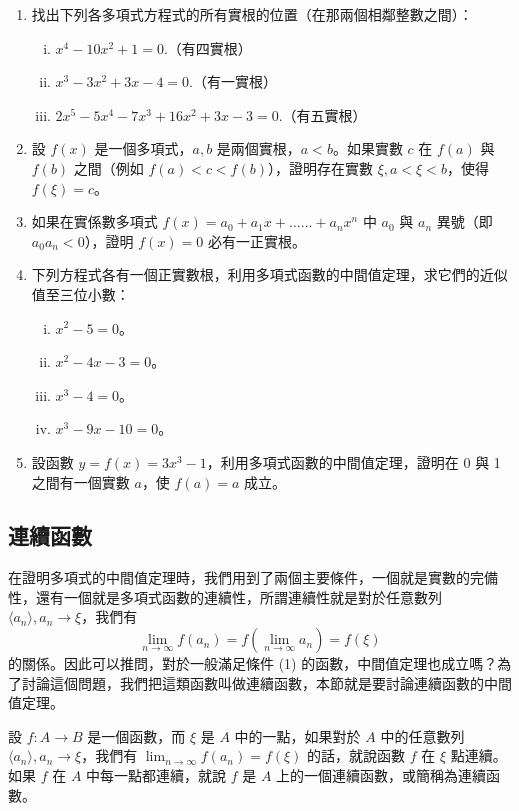 \begin{enumerate}
    \item 找出下列各多項式方程式的所有實根的位置（在那兩個相鄰整數之間）：
    \begin{enumerate}[(i)]
        \item $x^4-10x^2+1=0$.（有四實根）
        \item $x^3-3x^2+3x-4=0$.（有一實根）
        \item $2x^5-5x^4-7x^3+16x^2+3x-3=0$.（有五實根）
    \end{enumerate}
    \item 設 $f(x)$ 是一個多項式，$a, b$ 是兩個實根\label{note:b2-ch3-ex3-4-q2-roots}，$a < b$。如果實數 $c$ 在 $f(a)$ 與 $f(b)$ 之間（例如 $f(a) < c < f(b)$），證明存在實數 $\xi, a < \xi < b$，使得 $f(\xi) = c$。
    \item 如果在實係數多項式 $f(x) = a_0 + a_1 x + \dots\dots + a_n x^n$ 中 $a_0$ 與 $a_n$ 異號（即 $a_0 a_n < 0$），證明 $f(x)=0$ 必有一正實根。
    \item 下列方程式各有一個正實數根，利用多項式函數的中間值定理，求它們的近似值至三位小數：
    \begin{enumerate}[(i)]
        \item $x^2-5=0$。
        \item $x^2-4x-3=0$。
        \item $x^3-4=0$。
        \item $x^3-9x-10=0$。
    \end{enumerate}
    \item 設函數 $y=f(x)=3x^3-1$，利用多項式函數的中間值定理，證明在 0 與 1 之間有一個實數 $a$，使 $f(a)=a$ 成立。
\end{enumerate}

\subsection{連續函數}\label{sec:b2_3-5}

在證明多項式的中間值定理時，我們用到了兩個主要條件，一個就是實數的完備性，還有一個就是多項式函數的連續性，所謂連續性就是對於任意數列 $\langle a_n \rangle, a_n \to \xi$，我們有
\begin{equation}\tag{1}
\lim_{n\to\infty} f(a_n) = f(\lim_{n\to\infty} a_n) = f(\xi)
\end{equation}
的關係。因此可以推問，對於一般滿足條件 (1) 的函數，中間值定理也成立嗎？為了討論這個問題，我們把這類函數叫做連續函數，本節就是要討論連續函數的中間值定理。

\begin{definition*}
設 $f: A \longrightarrow B$ 是一個函數，而 $\xi$ 是 $A$ 中的一點，如果對於 $A$ 中的任意數列 $\langle a_n \rangle, a_n \to \xi$，我們有 $\lim_{n\to\infty} f(a_n) = f(\xi)$ 的話，就說函數 $f$ 在 $\xi$ 點連續。如果 $f$ 在 $A$ 中每一點都連續，就說 $f$ 是 $A$ 上的一個連續函數，或簡稱為連續函數。
\end{definition*}

